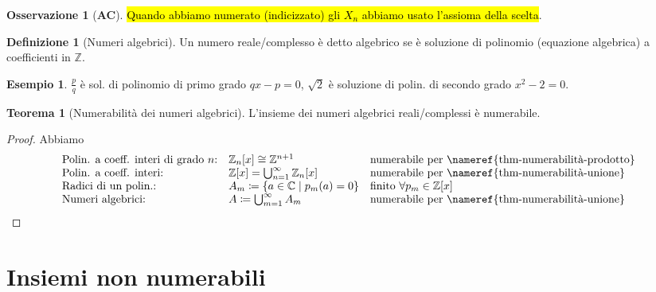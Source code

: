 \documentclass[a4paper,10pt]{article}
\theoremstyle{definition}
\newcommand{\za}{\mathbb{Z}} %
\theoremstyle{indentdefinition}
\newtheorem{defn}{Definizione}[section]
\theoremstyle{indentpostulate}
\theoremstyle{indenttheorem}
\newtheorem{thm}{Teorema}[section]
\theoremstyle{myremark}
\newtheorem*{rem*}{Osservazione}
\newtheorem{example*}{Esempio}
\theoremstyle{indentgeneral}
\newenvironment{myboxed} 
{\noindent\begin{lrbox}{\mybox}\begin{minipage}{\textwidth}}
{\end{minipage}\end{lrbox}\fbox{\usebox{\mybox}}}
\begin{document}
\begin{rem*}[\textbf{AC}] \hl{Quando abbiamo numerato (indicizzato) gli $X_n$ abbiamo usato l'assioma della scelta}.
    
\end{rem*}

\begin{defn}[Numeri algebrici]
    Un numero reale/complesso è detto algebrico se è soluzione di polinomio (equazione algebrica) a coefficienti in $\za$.
\end{defn}

\begin{example*}
    $\frac{p}{q}$ è sol. di polinomio di primo grado $qx-p=0$, $\sqrt{2}$ è soluzione di polin. di secondo grado $x^2-2=0$.
\end{example*}

\begin{myboxed}
    \begin{thm}[Numerabilità dei numeri algebrici]
        L'insieme dei numeri algebrici reali/complessi è numerabile.
    \end{thm}
\end{myboxed}

\begin{proof}
    Abbiamo
    $$\begin{array}{lll}
 \text{Polin. a coeff. interi di grado $n$:} &\za_n[x]\cong \za^{n+1}  &\text{numerabile per \nameref{thm-numerabilità-prodotto}}\\
 
        \text{Polin. a coeff. interi:} &\za[x]= \bigcup_{n=1}^\infty\za_n[x]  & \text{numerabile per \nameref{thm-numerabilità-unione}}\\
        
        \text{Radici di un polin.:} & A_m\coloneqq \{a\in\mathbb{C}\mid p_m(a)=0\}  &\text{finito $\forall p_m\in\za[x]$}\\
        
        \text{Numeri algebrici:} & A\coloneqq \bigcup_{m=1}^\infty A_m  &\text{numerabile per \nameref{thm-numerabilità-unione}}\\
    \end{array}$$
\end{proof}

\pagebreak{}
\section{Insiemi non numerabili}
\end{document}
